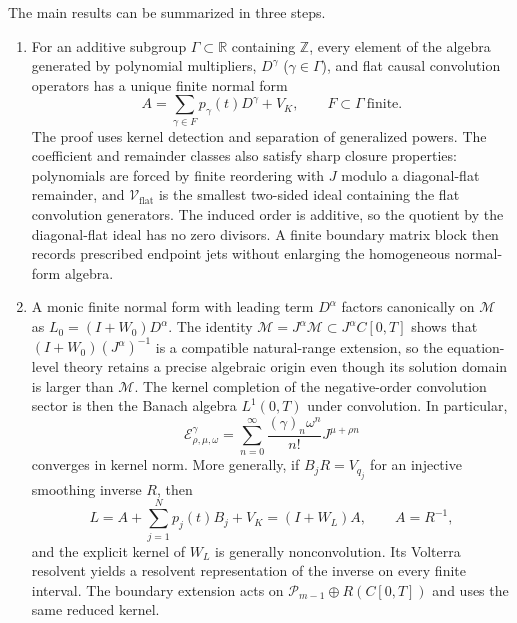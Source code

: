 \documentclass[11pt]{article}
\numberwithin{equation}{section}
\theoremstyle{definition}
\theoremstyle{remark}
\newcommand{\R}{\mathbb R}
\newcommand{\Z}{\mathbb Z}
\newcommand{\M}{\mathcal M}
\newcommand{\Vflat}{\mathcal V_{\mathrm{flat}}}
\newcommand{\E}{\mathcal E}
\begin{document}
The main results can be summarized in three steps.
\begin{enumerate}[leftmargin=*,label=\arabic*.]
\item For an additive subgroup $\Gamma\subset\R$ containing $\Z$, every element of the algebra generated by polynomial multipliers, $D^\gamma$ ($\gamma\in\Gamma$), and flat causal convolution operators has a unique finite normal form
\begin{equation*}
A=\sum_{\gamma\in F}p_\gamma(t)D^\gamma+V_K,
\qquad F\subset\Gamma\ \text{finite}.
\end{equation*}
The proof uses kernel detection and separation of generalized powers. The coefficient and remainder classes also satisfy sharp closure properties: polynomials are forced by finite reordering with $J$ modulo a diagonal-flat remainder, and $\Vflat$ is the smallest two-sided ideal containing the flat convolution generators. The induced order is additive, so the quotient by the diagonal-flat ideal has no zero divisors. A finite boundary matrix block then records prescribed endpoint jets without enlarging the homogeneous normal-form algebra.

\item A monic finite normal form with leading term $D^\alpha$ factors
canonically on $\M$ as $L_0=(I+W_0)D^\alpha$.  The identity
$\M=J^\alpha\M\subset J^\alpha C[0,T]$ shows that
$(I+W_0)(J^\alpha)^{-1}$ is a compatible natural-range extension, so the
equation-level theory retains a precise algebraic origin even though its
solution domain is larger than $\M$.  The kernel completion of the
negative-order convolution sector is then the Banach algebra $L^1(0,T)$ under convolution. In particular,
\begin{equation*}
\E_{\rho,\mu,\omega}^{\gamma}
=\sum_{n=0}^{\infty}\frac{(\gamma)_n\omega^n}{n!}J^{\mu+\rho n}
\end{equation*}
converges in kernel norm. More generally, if $B_jR=V_{q_j}$ for an injective smoothing inverse $R$, then
\begin{equation*}
L=A+\sum_{j=1}^{N}p_j(t)B_j+V_K=(I+W_L)A,
\qquad A=R^{-1},
\end{equation*}
and the explicit kernel of $W_L$ is generally nonconvolution. Its Volterra resolvent yields a resolvent representation of the inverse on every finite interval. The boundary extension acts on $\mathcal P_{m-1}\oplus R(C[0,T])$ and uses the same reduced kernel.


\end{enumerate}
\end{document}
